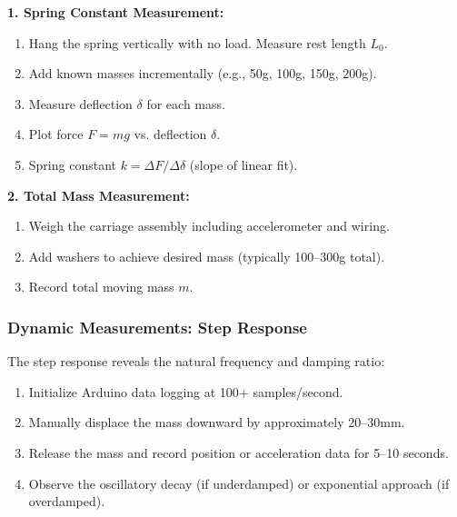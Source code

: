 \textbf{1. Spring Constant Measurement:}
\begin{enumerate}
\item Hang the spring vertically with no load. Measure rest length $L_0$.
\item Add known masses incrementally (e.g., 50g, 100g, 150g, 200g).
\item Measure deflection $\delta$ for each mass.
\item Plot force $F = mg$ vs. deflection $\delta$.
\item Spring constant $k = \Delta F / \Delta \delta$ (slope of linear fit).
\end{enumerate}

\textbf{2. Total Mass Measurement:}
\begin{enumerate}
\item Weigh the carriage assembly including accelerometer and wiring.
\item Add washers to achieve desired mass (typically 100--300g total).
\item Record total moving mass $m$.
\end{enumerate}

\subsubsection{Dynamic Measurements: Step Response}

The step response reveals the natural frequency and damping ratio:

\begin{enumerate}
\item Initialize Arduino data logging at 100+ samples/second.
\item Manually displace the mass downward by approximately 20--30mm.
\item Release the mass and record position or acceleration data for 5--10 seconds.
\item Observe the oscillatory decay (if underdamped) or exponential approach (if overdamped).
\end{enumerate}

